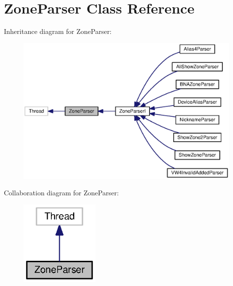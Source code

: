 \section{Zone\+Parser Class Reference}
\label{classorg_1_1smallfoot_1_1parser_1_1zone_1_1ZoneParser}


Inheritance diagram for Zone\+Parser\+:\nopagebreak
\begin{figure}[H]
\begin{center}
\leavevmode
\includegraphics[width=350pt]{classorg_1_1smallfoot_1_1parser_1_1zone_1_1ZoneParser__inherit__graph}
\end{center}
\end{figure}


Collaboration diagram for Zone\+Parser\+:\nopagebreak
\begin{figure}[H]
\begin{center}
\leavevmode
\includegraphics[width=112pt]{classorg_1_1smallfoot_1_1parser_1_1zone_1_1ZoneParser__coll__graph}
\end{center}
\end{figure}
